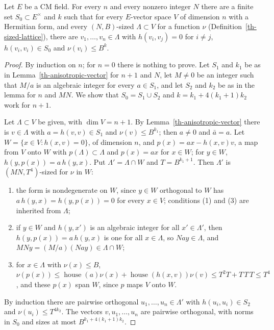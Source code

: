 \begin{lemma}\label{th-orthogonal-frame}
Let $E$ be a CM field. For every $n$ and every nonzero integer $N$ there are a
finite set $S_0\subset E^\times$ and $k$ such that for every $E$-vector space $V$
of dimension $n$ with a Hermitian form, and every $(N,B)$-sized $\Lambda\subset V$
for a function $\nu$ (Definition~\ref{th-sized-lattice}), there are
$v_1,\ldots,v_n\in\Lambda$ with $h(v_i,v_j)=0$ for $i\neq j$,
$h(v_i,v_i)\in S_0$ and $\nu(v_i)\leq B^k$.
\end{lemma}
\begin{proof}
By induction on $n$; for $n=0$ there is nothing to prove. Let $S_1$ and $k_1$ be
as in Lemma~\ref{th-anisotropic-vector} for $n+1$ and $N$, let $M\neq0$ be an
integer such that $M/a$ is an algebraic integer for every $a\in S_1$, and let
$S_2$ and $k_2$ be as in the lemma for $n$ and $MN$. We show that $S_0=S_1\cup S_2$
and $k=k_1+4(k_1+1)k_2$ work for $n+1$.

Let $\Lambda\subset V$ be given, with $\dim V=n+1$. By
Lemma~\ref{th-anisotropic-vector} there is $v\in\Lambda$ with $a=h(v,v)\in S_1$
and $\nu(v)\leq B^{k_1}$; then $a\neq0$ and $\bar a=a$. Let
$W=\{x\in V:h(x,v)=0\}$, of dimension $n$, and $p(x)=ax-h(x,v)v$, a map from $V$
onto $W$ with $p(\Lambda)\subset\Lambda$ and $p(x)=ax$ for $x\in W$; for $y\in W$,
$h(y,p(x))=a\,h(y,x)$. Put $\Lambda'=\Lambda\cap W$ and $T=B^{k_1+1}$. Then
$\Lambda'$ is $(MN,T^4)$-sized for $\nu$ in $W$:
\begin{enumerate}
\item the form is nondegenerate on $W$, since $y\in W$ orthogonal to $W$ has
  $a\,h(y,x)=h(y,p(x))=0$ for every $x\in V$; conditions (1) and (3) are
  inherited from $\Lambda$;
\item if $y\in W$ and $h(y,x')$ is an algebraic integer for all $x'\in\Lambda'$,
  then $h(y,p(x))=a\,h(y,x)$ is one for all $x\in\Lambda$, so $Nay\in\Lambda$, and
  $MNy=(M/a)(Nay)\in\Lambda\cap W$;
\item for $x\in\Lambda$ with $\nu(x)\leq B$,
  $\nu(p(x))\leq\operatorname{house}(a)\nu(x)+\operatorname{house}(h(x,v))\nu(v)\leq T^2T+T\,T\,T\leq T^4$,
  and these $p(x)$ span $W$, since $p$ maps $V$ onto $W$.
\end{enumerate}
By induction there are pairwise orthogonal $u_1,\ldots,u_n\in\Lambda'$ with
$h(u_i,u_i)\in S_2$ and $\nu(u_i)\leq T^{4k_2}$. The vectors $v,u_1,\ldots,u_n$
are pairwise orthogonal, with norms in $S_0$ and sizes at most
$B^{k_1+4(k_1+1)k_2}$.
\end{proof}

